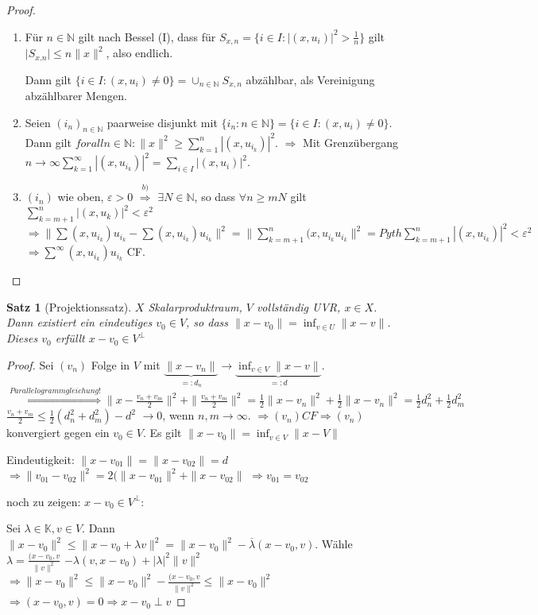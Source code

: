 \documentclass[ngerman]{report}
\theoremstyle{plain}%
\newtheorem{thm}{Satz}[chapter]
\theoremstyle{definition}%
\theoremstyle{myStyle}
\newcommand{\N}{\mathbb{N}}
\newcommand{\K}{\mathbb{K}}
\newcommand{\norm}[1]{\|#1\|}
\newcommand{\df}[1][]{%
	\overset{#1}{\Rightarrow}
}
\newcommand{\ff}[3]{(#1_#2)_{#2\in#3}}
\begin{document}
	\begin{proof}
		\begin{enumerate}
			\item Für $n\in\N$ gilt nach Bessel (I), dass für $S_{x,n} = \{ i\in I: |(x, u_i)| ^2 > \frac{1}{n} \}$ 
			gilt $|S_{x.n}| \leq n \norm{x}^2$, also endlich. \par
			Dann gilt $\{i \in I: (x,u_i) \neq 0\} = \cup_{n\in\N} S_{x,n}$ abzählbar, als Vereinigung abzählbarer Mengen.
			\item Seien $\ff{i}{n}{\N}$ paarweise disjunkt mit $\{i_n : n\in \N\} = \{i\in I: (x,u_i) \neq 0\}$.
			Dann gilt $forall n\in \N: \norm{x}^2 \geq \sum_{k=1}^n |(x,u_{i_k})|^2.$
			$\df$ Mit Grenzübergang $n\to \infty \sum_{k=1}^\infty |(x,u_{i_k})|^2 = \sum_{i\in I} |(x,u_i)|^2.$
			\item $(i_n)$ wie oben, $\varepsilon > 0$ 
			$\df[b)]$ $\exists N\in\N$, so dass $\forall n\geq m N$ gilt 
			$\sum_{k = m+1}^n |(x,u_k)|^2 < \varepsilon^2$
			$\df \norm{\sum (x,u_{i_k})u_{i_k} - \sum (x,u_{i_k}) u_{i_k}}^2
			= \norm{ \sum_{k= m+1} ^ n (x, u_{i_k} u_{i_k}}^2 = Pyth \sum_{k=m+1}^n |(x,u_{i_k})|^2 < \varepsilon^2$
			$\df \sum^\infty (x,u_{i_k})u_{i_k} $ CF.
		\end{enumerate}
	\end{proof}

	\begin{thm}[Projektionssatz]
		$X$ Skalarproduktraum, $V$ vollständig UVR, $x\in X$. Dann existiert ein eindeutiges $v_0 \in V$, so dass $\norm{x - v_0} = \inf_{v\in U} \norm{x - v}$. Dieses $v_0$ erfüllt $x - v_0 \in V^\perp$	
	\end{thm}
	\begin{proof}
		Sei $(v_n)$ Folge in $V$ mit $\underbrace{\norm{x-v_n}}_{=: d_n} \to \underbrace{\inf_{v\in V}\norm{x-v}}_{=: d}.$
		$\df[Parallelogrammgleichung!] \norm{x - \frac{v_n+v_m}{2}}^2 + \norm{\frac{v_n+v_m}{2}}^2
		= \frac{1}{2}\norm{x- v_n}^2 + \frac{1}{2}\norm{x-v_n}^2 = \frac{1}{2} d_n^2 + \frac{1}{2} d_m^2$
	$\frac{v_n+v_m}{2} \leq \frac{1}{2} (d_n^2 + d_m^2) - d^2$ $\to 0$, wenn $n,m \to \infty$.
	$\df (v_n) CF \df (v_n)$ konvergiert gegen ein $v_0 \in V$.
	Es gilt $\norm{x-v_0} = \inf_{v\in V}\norm{x-V}$ \par
	Eindeutigkeit: $\norm{x - v_{01}} = \norm{x - v_{02}}	= d$
	$\df \norm{v_{01} - v_{02}}^2 = 2(\norm{x - v_{01}}^2 + \norm{x - v_{02}} $
	$\df v_{01} = v_{02}$\par
	noch zu zeigen: $x-v_0 \in V^\perp:$\par
	Sei $\lambda\in \K, v\in V$. Dann $\norm{x - v_{0}}^2 \leq \norm{x - v_{0} + \lambda v}^2
	= \norm{x - v_{0}}^2 - \overline{\lambda}(x-v_0,v)$.
	Wähle $\lambda = \frac{(x-v_0,v}{\norm{v}^2}$ $-\lambda(v,x-v_0) + |\lambda|^2\norm{v}^2$
	$\df \norm{x - v_{0}}^2 \leq \norm{x - v_{0}}^2 - \frac{(x-v_0,v}{\norm{v}^2} \leq \norm{x - v_{0}}^2$	
	$\df (x-v_0,v) = 0 \df x-v_0 \perp v$
	\end{proof}
	
\end{document}
